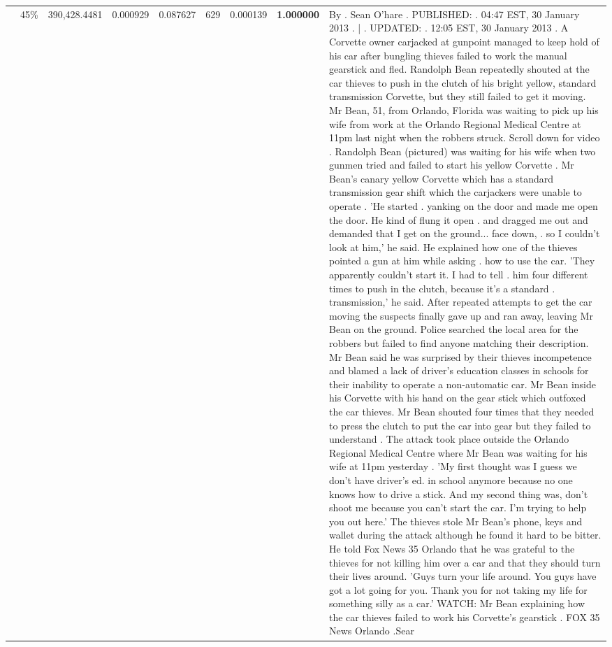\begin{table}[H]
\begin{tabular}{llrrrrrrl}
 & 45\% & 390,428.4481 & 0.000929 & 0.087627 & \color{red} 629 & 0.000139 & \bfseries \color{red} 1.000000 & By . Sean O'hare . PUBLISHED: . 04:47 EST, 30 January 2013 . | . UPDATED: . 12:05 EST, 30 January 2013 . A Corvette owner carjacked at gunpoint managed to keep hold of his car after bungling thieves failed to work the manual gearstick and fled. Randolph Bean repeatedly shouted at the car thieves to push in the clutch of his bright yellow, standard transmission Corvette, but they still failed to get it moving. Mr Bean, 51, from Orlando, Florida was waiting to pick up his wife from work at the Orlando Regional Medical Centre at 11pm last night when the robbers struck. Scroll down for video . Randolph Bean (pictured) was waiting for his wife when two gunmen tried and failed to start his yellow Corvette . Mr Bean's canary yellow Corvette which has a standard transmission gear shift which the carjackers were unable to operate . 'He started . yanking on the door and made me open the door. He kind of flung it open . and dragged me out and demanded that I get on the ground... face down, . so I couldn't look at him,' he said. He explained how one of the thieves pointed a gun at him while asking . how to use the car. 'They apparently couldn't start it. I had to tell . him four different times to push in the clutch, because it's a standard . transmission,' he said. After repeated attempts to get the car moving the suspects finally gave up and ran away, leaving Mr Bean on the ground. Police searched the local area for the robbers but failed to find anyone matching their description. Mr Bean said he was surprised by their thieves incompetence and blamed a lack of driver's education classes in schools for their inability to operate a non-automatic car. Mr Bean inside his Corvette with his hand on the gear stick which outfoxed the car thieves. Mr Bean shouted four times that they needed to press the clutch to put the car into gear but they failed to understand . The attack took place outside the Orlando Regional Medical Centre where Mr Bean was waiting for his wife at 11pm yesterday . 'My first thought was I guess we don't have driver's ed. in school anymore because no one knows how to drive a stick. And my second thing was, don't shoot me because you can't start the car. I'm trying to help you out here.' The thieves stole Mr Bean's phone, keys and wallet during the attack although he found it hard to be bitter. He told Fox News 35 Orlando that he was grateful to the thieves for not killing him over a car and that they should turn their lives around. 'Guys turn your life around. You guys have got a lot going for you. Thank you for not taking my life for something silly as a car.' WATCH: Mr Bean explaining how the car thieves failed to work his Corvette's gearstick . FOX 35 News Orlando .Sear \\

\end{tabular}
\end{table}
